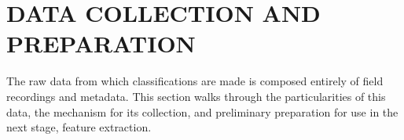 \chapter{DATA COLLECTION AND PREPARATION}

The raw data from which classifications are made is composed entirely of field
recordings and metadata.
This section walks through the particularities of this data, the mechanism for
its collection, and preliminary preparation for use in the next
stage, feature extraction.

